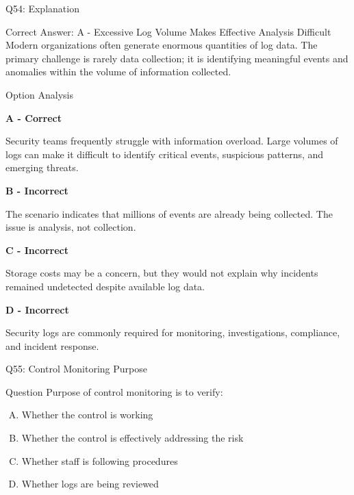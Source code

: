 \documentclass{beamer}
\begin{document}
	\begin{frame}[shrink=10]{Q54: Explanation}
		\footnotesize
		
		\begin{block}{Correct Answer: A - Excessive Log Volume Makes Effective Analysis Difficult}
			Modern organizations often generate enormous quantities of
			log data. The primary challenge is rarely data collection;
			it is identifying meaningful events and anomalies within the
			volume of information collected.
		\end{block}
		
		\begin{block}{Option Analysis}
			
			\textbf{A - Correct}
			
			Security teams frequently struggle with information overload.
			Large volumes of logs can make it difficult to identify
			critical events, suspicious patterns, and emerging threats.
			
			\vspace{0.15cm}
			
			\textbf{B - Incorrect}
			
			The scenario indicates that millions of events are already
			being collected. The issue is analysis, not collection.
			
			\vspace{0.15cm}
			
			\textbf{C - Incorrect}
			
			Storage costs may be a concern, but they would not explain
			why incidents remained undetected despite available log data.
			
			\vspace{0.15cm}
			
			\textbf{D - Incorrect}
			
			Security logs are commonly required for monitoring,
			investigations, compliance, and incident response.
			
		\end{block}
		

		
	\end{frame}
	
	\begin{frame}{Q55: Control Monitoring Purpose}
		\begin{block}{Question}
			Purpose of control monitoring is to verify:
		\end{block}
		\begin{enumerate}[(A)]
			\item Whether the control is working
			\item Whether the control is effectively addressing the risk
			\item Whether staff is following procedures
			\item Whether logs are being reviewed
		\end{enumerate}
	\end{frame}
	
\end{document}

